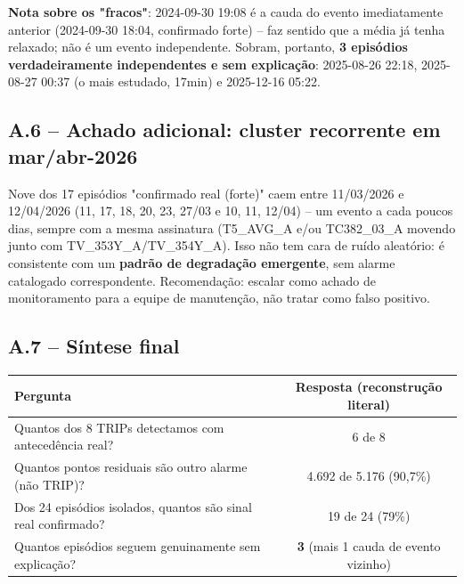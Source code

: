 \documentclass[11pt,a4paper]{article}
\begin{document}
\textbf{Nota sobre os "fracos"}: 2024-09-30 19:08 é a cauda do evento
imediatamente anterior (2024-09-30 18:04, confirmado forte) -- faz
sentido que a média já tenha relaxado; não é um evento independente.
Sobram, portanto, \textbf{3 episódios verdadeiramente independentes e
sem explicação}: 2025-08-26 22:18, 2025-08-27 00:37 (o mais estudado,
17min) e 2025-12-16 05:22.

\subsection{A.6 -- Achado adicional: cluster recorrente em mar/abr-2026}

Nove dos 17 episódios "confirmado real (forte)" caem entre
11/03/2026 e 12/04/2026 (11, 17, 18, 20, 23, 27/03 e 10, 11, 12/04) --
um evento a cada poucos dias, sempre com a mesma assinatura
(T5\_AVG\_A e/ou TC382\_03\_A movendo junto com TV\_353Y\_A/TV\_354Y\_A).
Isso não tem cara de ruído aleatório: é consistente com um
\textbf{padrão de degradação emergente}, sem alarme catalogado
correspondente. Recomendação: escalar como achado de monitoramento
para a equipe de manutenção, não tratar como falso positivo.

\subsection{A.7 -- Síntese final}

\begin{table}[H]
\centering
\begin{tabular}{lc}
\toprule
\textbf{Pergunta} & \textbf{Resposta (reconstrução literal)} \\
\midrule
Quantos dos 8 TRIPs detectamos com antecedência real? & 6 de 8 \\
Quantos pontos residuais são outro alarme (não TRIP)? & 4.692 de 5.176 (90,7\%) \\
Dos 24 episódios isolados, quantos são sinal real confirmado? & 19 de 24 (79\%) \\
Quantos episódios seguem genuinamente sem explicação? & \textbf{3} (mais 1 cauda de evento vizinho) \\
\bottomrule
\end{tabular}
\end{table}
\end{document}
